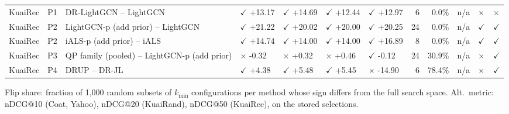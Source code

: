 \begin{table}[htbp]
{\begin{tabular}{lllllllrrlll}
KuaiRec & P1 & DR-LightGCN -- LightGCN & $\checkmark$ +13.17 & $\checkmark$ +14.69 & $\checkmark$ +12.44 & $\checkmark$ +12.97 & 6 & 0.0\% & n/a & $\times$ & $\times$ \\
KuaiRec & P2 & LightGCN-p (add prior) -- LightGCN & $\checkmark$ +21.22 & $\checkmark$ +20.02 & $\checkmark$ +20.00 & $\checkmark$ +20.25 & 24 & 0.0\% & n/a & $\checkmark$ & $\checkmark$ \\
KuaiRec & P2 & iALS-p (add prior) -- iALS & $\checkmark$ +14.74 & $\checkmark$ +14.00 & $\checkmark$ +14.00 & $\checkmark$ +16.89 & 8 & 0.0\% & n/a & $\checkmark$ & $\checkmark$ \\
KuaiRec & P3 & QP family (pooled) -- LightGCN-p (add prior) & $\times$ -0.32 & $\times$ +0.32 & $\times$ +0.46 & $\checkmark$ -0.12 & 24 & 30.9\% & n/a & $\times$ & $\checkmark$ \\
KuaiRec & P4 & DRUP -- DR-JL & $\checkmark$ +4.38 & $\checkmark$ +5.48 & $\checkmark$ +5.45 & $\times$ -14.90 & 6 & 78.4\% & n/a & $\times$ & $\checkmark$ \\
\bottomrule
\end{tabular}}
\par\smallskip\raggedright\footnotesize Flip share: fraction of 1,000 random subsets of $k_\mathrm{min}$ configurations per method whose sign differs from the full search space. Alt.\ metric: nDCG@10 (Coat, Yahoo), nDCG@20 (KuaiRand), nDCG@50 (KuaiRec), on the stored selections.
\end{table}
